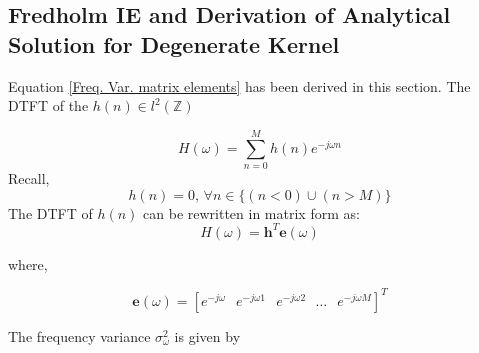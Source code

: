 \begin{appendix}
\appendixpage
\chapter{}
\pagestyle{empty}
\section{\label{apen:derivationdegenerate}Fredholm IE and Derivation of Analytical Solution for Degenerate Kernel}
\label{appendix-1}

Equation \ref{Freq. Var. matrix elements} has been derived in this section. The DTFT of the $h(n) \in l^2(\mathbb{Z})$  

\begin{equation}
H(\omega)=\sum^{M}_{n=0}h(n) e^{-j\omega n}
\end{equation}
Recall,
\begin{equation*}
h(n)=0 ,\, \forall n \in \{ (n < 0) \cup (n > M)\}
\end{equation*}
The DTFT of $h(n)$ can be rewritten in matrix form as:
\begin{equation}
H(\omega)=\mathbf{h}^{T}\mathbf{e}(\omega)
\end{equation}

where,

\begin{equation}
\mathbf{e}(\omega)=[e^{-j\omega}\,\,\,\ e^{-j\omega 1}\,\,\,\ e^{-j\omega 2}\,\,\,\,\ldots\,\,\,\ e^{-j\omega M}]^T
\end{equation}

The frequency variance $\sigma_{\omega}^{2}$ is given by


\end{appendix}
